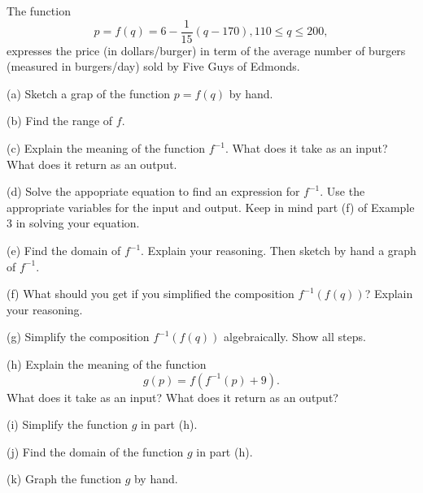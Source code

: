 \documentclass{ximera}
\begin{document}
\begin{example}  \label{Ex3:Inverse}
The function
\[
    p = f(q) = 6 - \frac{1}{15} \left(  q- 170 \right) , 110 \leq q \leq 200 ,
\]
expresses the price (in dollars/burger) in term of the average number of burgers (measured in burgers/day) sold by Five Guys of Edmonds.

(a) Sketch a grap of the function $p=f(q)$ by hand.

(b) Find the range of $f$.

(c) Explain the meaning of the function $f^{-1}$. What does it take as an input? What does it return as an output.

(d) Solve the appopriate equation to find an expression for $f^{-1}$. Use the appropriate variables for the input and output. Keep in mind part (f) of Example 3 in solving your equation.

(e) Find the domain of $f^{-1}$. Explain your reasoning. Then sketch by hand a graph of $f^{-1}$.

(f) What should you get if you simplified the composition $f^{-1}(f(q))$? Explain your reasoning.

(g) Simplify the composition $f^{-1}(f(q))$ algebraically. Show all steps.

(h) Explain the meaning of the function 
\[
  g(p) = f(f^{-1}(p)+9).
\]
What does it take as an input? What does it return as an output?

(i) Simplify the function $g$ in part (h).

(j) Find the domain of the function $g$ in part (h).

(k) Graph the function $g$ by hand. 


\end{example}
\end{document}

